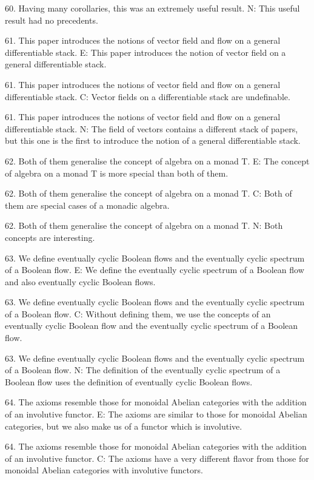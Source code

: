 60. Having many corollaries, this was an extremely useful result.
N: This useful result had no precedents.

61. This paper introduces the notions of vector field and flow on a general differentiable stack.
E: This paper introduces the notion of vector field on a general differentiable stack.

61. This paper introduces the notions of vector field and flow on a general differentiable stack.
C: Vector fields on a differentiable stack are undefinable.

61. This paper introduces the notions of vector field and flow on a general differentiable stack.
N: The field of vectors contains a different stack of papers, but this one is the first to introduce the notion of a general differentiable stack.

62. Both of them generalise the concept of algebra on a monad T.
E: The concept of algebra on a monad T is more special than both of them.

62. Both of them generalise the concept of algebra on a monad T.
C: Both of them are special cases of a monadic algebra.

62. Both of them generalise the concept of algebra on a monad T.
N: Both concepts are interesting.

63. We define eventually cyclic Boolean flows and the eventually cyclic spectrum of a Boolean flow.
E: We define the eventually cyclic spectrum of a Boolean flow and also eventually cyclic Boolean flows.

63. We define eventually cyclic Boolean flows and the eventually cyclic spectrum of a Boolean flow.
C: Without defining them, we use the concepts of an eventually cyclic Boolean flow and the eventually cyclic spectrum of a Boolean flow.

63. We define eventually cyclic Boolean flows and the eventually cyclic spectrum of a Boolean flow.
N: The definition of the eventually cyclic spectrum of a Boolean flow uses the definition of eventually cyclic Boolean flows.

64. The axioms resemble those for monoidal Abelian categories with the addition of an involutive functor.
E: The axioms are similar to those for monoidal Abelian categories, but we also make us of a functor which is involutive.

64. The axioms resemble those for monoidal Abelian categories with the addition of an involutive functor.
C: The axioms have a very different flavor from those for monoidal Abelian categories with involutive functors.

